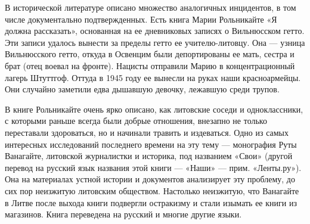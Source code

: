 В исторической литературе описано множество аналогичных инцидентов, в том числе
документально подтвержденных. Есть книга Марии Рольникайте «Я должна
рассказать», основанная на ее дневниковых записях о Вильнюсском гетто. Эти
записи удалось вынести за пределы гетто ее учителю-литовцу. Она — узница
Вильнюсского гетто, откуда в Освенцим были депортированы ее мать, сестра и брат
(отец воевал на фронте). Нацисты отправили Марию в концентрационный лагерь
Штуттгоф. Оттуда в 1945 году ее вынесли на руках наши красноармейцы. Они
случайно заметили едва дышавшую девочку, лежавшую среди трупов.

В книге Рольникайте очень ярко описано, как литовские соседи и одноклассники, с
которыми раньше всегда были добрые отношения, внезапно не только переставали
здороваться, но и начинали травить и издеваться. Одно из самых интересных
исследований последнего времени на эту тему — монография Руты Ванагайте,
литовской журналистки и историка, под названием «Свои» (другой перевод на
русский язык названия этой книги — «Наши» — прим. «Ленты.ру»). Она на
материалах устной истории и документов анализирует эту проблему, до сих пор
неизжитую литовским обществом. Настолько неизжитую, что Ванагайте в Литве после
выхода книги подвергли остракизму и стали изымать ее книги из магазинов. Книга
переведена на русский и многие другие языки.

